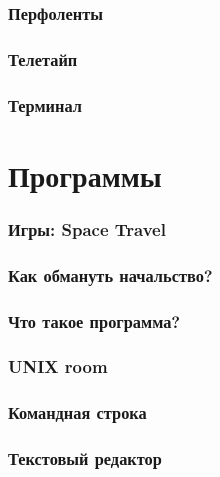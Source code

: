 \documentclass[t,aspectratio=169]{beamer}
\begin{document}
\begin{frame}
    \frametitle{Перфоленты}
\end{frame}

\begin{frame}
    \frametitle{Телетайп}
\end{frame}

\begin{frame}
    \frametitle{Терминал}
\end{frame}

\section{Программы}
\begin{frame}
    \frametitle{Игры: Space Travel}
\end{frame}

\begin{frame}
    \frametitle{Как обмануть начальство?}
\end{frame}

\begin{frame}
    \frametitle{Что такое программа?}
\end{frame}

\begin{frame}
    \frametitle{UNIX room}
\end{frame}

\begin{frame}
    \frametitle{Командная строка}
\end{frame}

\begin{frame}
    \frametitle{Текстовый редактор}
\end{frame}
\end{document}
